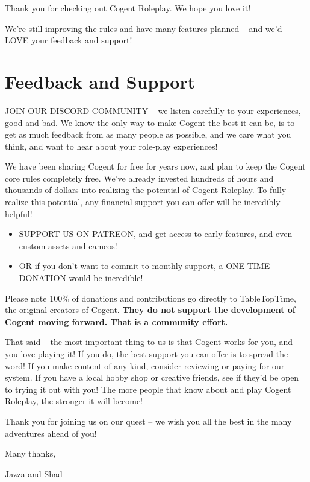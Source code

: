 Thank you for checking out Cogent Roleplay. We hope you love it!

We’re still improving the rules and have many features planned – and we’d LOVE your feedback and support!

\section{Feedback and Support}

\href{http://discord.gg/5MrsGukbTq}{JOIN OUR DISCORD COMMUNITY} – we listen carefully to your experiences, good and bad. We know the only way to make Cogent the best it can be, is to get as much feedback from as many people as possible, and we care what you think, and want to hear about your role-play experiences!

We have been sharing Cogent for free for years now, and plan to keep the Cogent core rules completely free. We’ve already invested hundreds of hours and thousands of dollars into realizing the potential of Cogent Roleplay. To fully realize this potential, any financial support you can offer will be incredibly helpful!

\begin{itemize}
    \item \href{https://www.patreon.com/tabletoptime/}{SUPPORT US ON PATREON}, and get access to early features, and even custom assets and cameos!
    \item OR if you don’t want to commit to monthly support, a \href{https://www.buymeacoffee.com/tabletoptime}{ONE-TIME DONATION} would be incredible!
\end{itemize}


Please note 100\% of donations and contributions go directly to TableTopTime, the original creators of Cogent. \textbf{They do not support the development of Cogent moving forward. That is a community effort.}

That said – the most important thing to us is that Cogent works for you, and you love playing it! If you do, the best support you can offer is to spread the word! If you make content of any kind, consider reviewing or paying for our system. If you have a local hobby shop or creative friends, see if they’d be open to trying it out with you! The more people that know about and play Cogent Roleplay, the stronger it will become!

Thank you for joining us on our quest – we wish you all the best in the many adventures ahead of you!

Many thanks,

Jazza and Shad